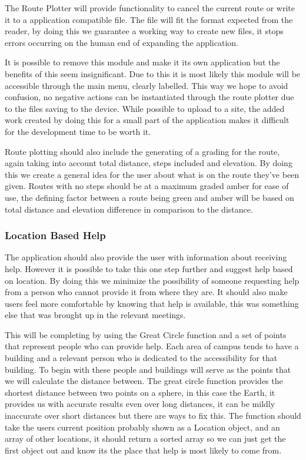 \documentclass[10pt,a4paper]{article}
\begin{document}
The Route Plotter will provide functionality to cancel the current route or write it to a application compatible file. The file will fit the format expected from the reader, by doing this we guarantee a working way to create new files, it stops errors occurring on the human end of expanding the application. 

It is possible to remove this module and make it its own application but the benefits of this seem insignificant. Due to this it is most likely this module will be accessible through the main menu, clearly labelled. This way we hope to avoid confusion, no negative actions can be instantiated through the route plotter due to the files saving to the device. While possible to upload to a site, the added work created by doing this for a small part of the application makes it difficult for the development time to be worth it.

Route plotting should also include the generating of a grading for the route, again taking into account  total distance, steps included and elevation. By doing this we create a general idea for the user about what is on the route they've been given. Routes with no steps should be at a maximum graded amber for ease of use, the defining factor between a route being green and amber will be based on total distance and elevation difference in comparison to the distance. 

\subsubsection{Location Based Help}
The application should also provide the user with information about receiving help. However it is possible to take this one step further and suggest help based on location. By doing this we minimize the possibility of someone requesting help from a person who cannot provide it from where they are. It should also make users feel more comfortable by knowing that help is available, this was something else that was brought up in the relevant meetings. 

This will be completing by using the Great Circle function and a set of points that represent people who can provide help. Each area of campus tends to have a building and a relevant person who is dedicated to the accessibility for that building. To begin with these people and buildings will serve as the points that we will calculate the distance between. The great circle function provides the shortest distance between two points on a sphere, in this case the Earth, it provides us with accurate results even over long distances, it can be mildly inaccurate over short distances but there are ways to fix this. The function should take the users current position probably shown as a Location object, and an array of other locations, it should return a sorted array so we can just get the first object out and know its the place that help is most likely to come from. 
\end{document}
